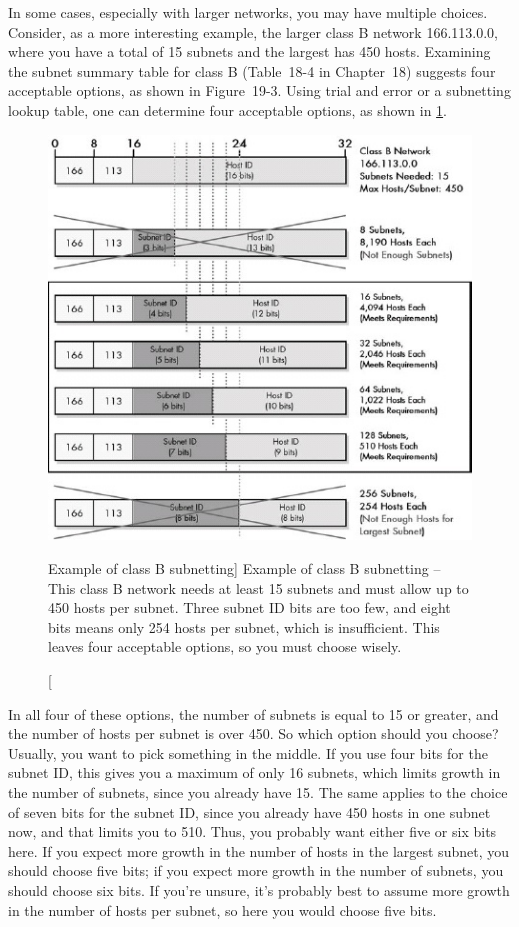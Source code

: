 In some cases, especially with larger networks, you may have multiple choices.
Consider, as a more interesting example, the larger class B network 166.113.0.0, where you have a total of 15 subnets and the largest has 450 hosts.
Examining the subnet summary table for class B (Table~18-4 in Chapter~18) suggests four acceptable options, as shown in Figure~19-3.
Using trial and error or a subnetting lookup table, one can determine four acceptable options, as shown in \cref{fig:subnetting-class-b-options}.

\begin{figure}
   \centering
   \includegraphics[width=.8\textwidth]{images/subnetting-class-b-options.jpg}
   \caption
      [Example of class B subnetting]
      {Example of class B subnetting --
      This class B network needs at least 15 subnets and must allow up to 450 hosts per subnet.
      Three subnet ID bits are too few, and eight bits means only 254 hosts per subnet, which is insufficient.
      This leaves four acceptable options, so you must choose wisely.}
   \label{fig:subnetting-class-b-options}
\end{figure}


In all four of these options, the number of subnets is equal to 15 or greater, and the number of hosts per subnet is over 450.
So which option should you choose?
Usually, you want to pick something in the middle.
If you use four bits for the subnet ID, this gives you a maximum of only 16 subnets, which limits growth in the number of subnets, since you already have 15.
The same applies to the choice of seven bits for the subnet ID, since you already have 450 hosts in one subnet now, and that limits you to 510.
Thus, you probably want either five or six bits here.
If you expect more growth in the number of hosts in the largest subnet, you should choose five bits; if you expect more growth in the number of subnets, you should choose six bits.
If you're unsure, it's probably best to assume more growth in the number of hosts per subnet, so here you would choose five bits.

